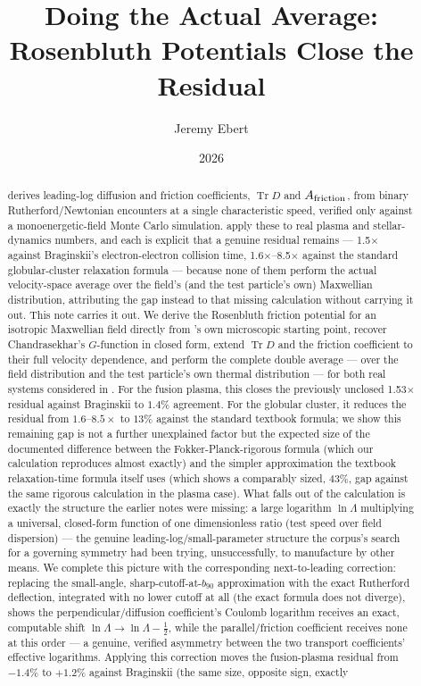 \documentclass[12pt]{amsart}
\title[Closing the Residual with Rosenbluth Potentials]{Doing the Actual Average:\\
Rosenbluth Potentials Close the Residual}
\author{Jeremy Ebert}
\date{2026}
\theoremstyle{plain}
\theoremstyle{remark}
\begin{document}
\maketitle

\begin{abstract}
\cite{Ebert2026Bath} derives leading-log diffusion and friction coefficients, $\operatorname{Tr}D$ and $A_{\rm friction}$, from binary Rutherford/Newtonian encounters at a single characteristic speed, verified only against a monoenergetic-field Monte Carlo simulation. \cite{Ebert2026Fusion,Ebert2026Cluster,Ebert2026Residual} apply these to real plasma and stellar-dynamics numbers, and each is explicit that a genuine residual remains --- 1.5$\times$ against Braginskii's electron-electron collision time, 1.6$\times$--8.5$\times$ against the standard globular-cluster relaxation formula --- because none of them perform the actual velocity-space average over the field's (and the test particle's own) Maxwellian distribution, attributing the gap instead to that missing calculation without carrying it out. This note carries it out. We derive the Rosenbluth friction potential for an isotropic Maxwellian field directly from \cite{Ebert2026Bath}'s own microscopic starting point, recover Chandrasekhar's $G$-function in closed form, extend $\operatorname{Tr}D$ and the friction coefficient to their full velocity dependence, and perform the complete double average --- over the field distribution and the test particle's own thermal distribution --- for both real systems considered in \cite{Ebert2026Fusion,Ebert2026Cluster}. For the fusion plasma, this closes the previously unclosed 1.53$\times$ residual against Braginskii to $1.4\%$ agreement. For the globular cluster, it reduces the residual from $1.6$--$8.5\times$ to $13\%$ against the standard textbook formula; we show this remaining gap is not a further unexplained factor but the expected size of the documented difference between the Fokker-Planck-rigorous formula (which our calculation reproduces almost exactly) and the simpler approximation the textbook relaxation-time formula itself uses (which shows a comparably sized, $43\%$, gap against the same rigorous calculation in the plasma case). What falls out of the calculation is exactly the structure the earlier notes were missing: a large logarithm $\ln\Lambda$ multiplying a universal, closed-form function of one dimensionless ratio (test speed over field dispersion) --- the genuine leading-log/small-parameter structure the corpus's search for a governing symmetry had been trying, unsuccessfully, to manufacture by other means. We complete this picture with the corresponding next-to-leading correction: replacing the small-angle, sharp-cutoff-at-$b_{90}$ approximation with the exact Rutherford deflection, integrated with no lower cutoff at all (the exact formula does not diverge), shows the perpendicular/diffusion coefficient's Coulomb logarithm receives an exact, computable shift $\ln\Lambda\to\ln\Lambda-\tfrac12$, while the parallel/friction coefficient receives none at this order --- a genuine, verified asymmetry between the two transport coefficients' effective logarithms. Applying this correction moves the fusion-plasma residual from $-1.4\%$ to $+1.2\%$ against Braginskii (the same size, opposite sign, exactly 
\end{abstract}
\end{document}
